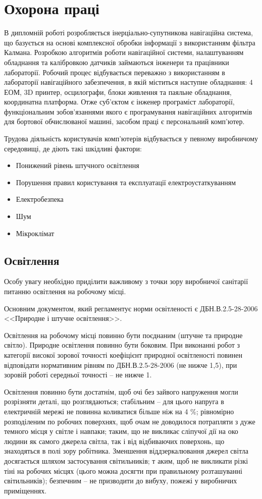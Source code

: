 \documentclass[ukrainian,utf8,simple,floatsingle,hpadding=5mm]{eskdtext}
\begin{document}
\section{Охорона праці}

В дипломній роботі розробляється інерціально-супутникова навігаційна система, що базується на
основі комплексної обробки інформації з використанням фільтра Калмана. Розробкою алгоритмів роботи
навігаційної системи, налаштуванням обладнання та калібровкою датчиків займаються інженери та 
працівники лабораторії. Робочий процес відбувається переважно з використанням  в лабораторії навігаційного забезпечення, в якій міститься наступне обладнання: 4 ЕОМ, 3D принтер, осцилографи, блоки живлення та паяльне обладнання, координатна платформа. 
 Отже суб’єктом є інженер програміст лабораторії, функціональним зобов'язаннями якого є 
програмування навігаційних алгоритмів для бортової обчислюваної машині, засобом праці є персональний комп'ютер.

Трудова діяльність користувачів комп’ютерів відбувається у певному виробничому середовищі, де 
діють такі шкідливі фактори: 
\begin{itemize}
  \item Понижений рівень штучного освітлення 
  \item Порушення правил користування та експлуатації електроустаткуванням
  \item Електробезпека
  \item Шум
  \item Мікроклімат
\end{itemize}

\subsection{Освітлення}
Особу увагу необхідно приділити важливому з точки зору виробничої санітарії 
питанню освітлення на робочому місці.


Основним документом, який регламентує норми освітленості є ДБН.В.2.5-28-2006
<<Природне і штучне освітлення>>. 

Освітлення на робочому місці повинно бути поєднаним (штучне та природне світло). 
Природне освітлення повинно бути боковим. При виконанні робот з категорії високої 
зорової точності коефіцієнт природної освітленості повинен відповідати нормативним 
рівням по ДБН.В.2.5-28-2006 (не нижче 1,5), при зоровій роботі середньої точності – не нижче 1.


Освітлення повинно бути достатнім, щоб очі без зайвого напруження могли розрізняти деталі, що розглядаються; стабільним – 
для цього напруга в електричній мережі не повинна коливатися більше ніж на 4 \%; 
рівномірно розподіленим по робочих поверхнях, щоб очам не доводилося 
потрапляти з дуже темного місця у світле і навпаки; 
таким, що не викликає сліпучої дії на око людини як самого джерела 
світла, так і від відбиваючих поверхонь, що знаходяться в полі зору робітника. 
Зменшення віддзеркалювання джерел світла досягається шляхом застосування світильників; т
аким, щоб не викликати різкі тіні на робочих місцях (цього можна досягти при правильному 
розташуванні світильників); безпечним – не призводити до вибуху, пожежі у виробничих приміщеннях.
\end{document}
